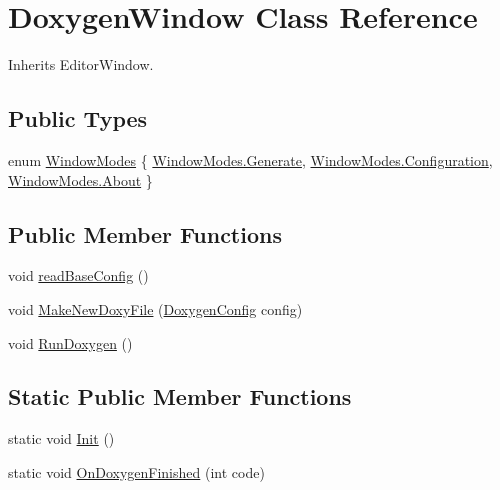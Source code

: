 \hypertarget{class_doxygen_window}{}\section{Doxygen\+Window Class Reference}
\label{class_doxygen_window}


 




Inherits Editor\+Window.

\subsection*{Public Types}
\begin{DoxyCompactItemize}
\item 
enum \hyperlink{class_doxygen_window_ad1f6043062e30f52cb634b72294a5676}{Window\+Modes} \{ \hyperlink{class_doxygen_window_ad1f6043062e30f52cb634b72294a5676a32b919d18cfaca89383f6000dcc9c031}{Window\+Modes.\+Generate}, 
\hyperlink{class_doxygen_window_ad1f6043062e30f52cb634b72294a5676a254f642527b45bc260048e30704edb39}{Window\+Modes.\+Configuration}, 
\hyperlink{class_doxygen_window_ad1f6043062e30f52cb634b72294a5676a8f7f4c1ce7a4f933663d10543562b096}{Window\+Modes.\+About}
 \}
\end{DoxyCompactItemize}
\subsection*{Public Member Functions}
\begin{DoxyCompactItemize}
\item 
void \hyperlink{class_doxygen_window_a5ba38d9b1d93fa627bc3b53cdd1dda17}{read\+Base\+Config} ()
\item 
void \hyperlink{class_doxygen_window_abf3c2a3c3a53e6691e58b865da8404de}{Make\+New\+Doxy\+File} (\hyperlink{class_doxygen_config}{Doxygen\+Config} config)
\item 
void \hyperlink{class_doxygen_window_a63924417d5b5b7a71570ec9a9ef1ca5e}{Run\+Doxygen} ()
\end{DoxyCompactItemize}
\subsection*{Static Public Member Functions}
\begin{DoxyCompactItemize}
\item 
static void \hyperlink{class_doxygen_window_a48f456c44b07cc9283a0583579b1d65a}{Init} ()
\item 
static void \hyperlink{class_doxygen_window_a2809a93b756a6cfc371ee76a9d7168d7}{On\+Doxygen\+Finished} (int code)
\end{DoxyCompactItemize}
